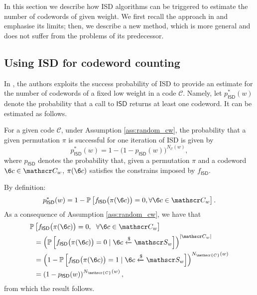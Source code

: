In this section we describe how ISD algorithms can be triggered to estimate the number of codewords of given weight. 
We first recall the approach in \cite{hirotomo} and emphasise its limits; then, we describe a new method, which is more general and does not suffer from the problems of its predecessor.

\subsection{Using ISD for codeword counting}

In \cite{hirotomo}, the authors exploits the success probability of ISD to provide an estimate for the number of codewords of a fixed low weight in a code $\mathscr{C}$.
Namely, let $p^*_{\mathsf{ISD}}(w)$ denote the probability that a call to $\mathsf{ISD}$ returns at least one codeword.
It can be estimated as follows.
\begin{proposition}
For a given code $\mathscr C$, under Assumption \ref{ass:random_cw}, the probability that a given permutation $\pi$ is successful for one iteration of ISD is given by
\begin{equation}
\label{eq:japan}
p^{*}_{\mathsf{ISD}}(w) = 1 - \big(1- p_{\mathsf{ISD}}(w)\big)^{N_{\mathscr{C}}(w)},
\end{equation}
where $p_{\mathsf{ISD}}$ denotes the probability that, given a permutation $\pi$ and a codeword $\6c\in\mathscr C_w$, $\pi(\6c)$ satisfies the constrains imposed by $f_{\mathsf{ISD}}$.
\end{proposition}
\begin{IEEEproof}
By definition:
\begin{equation*}
p^{*}_{\mathsf{ISD}}(w) = 1 - \mathbb{P}\left[f_{\mathsf{ISD}}\big(\pi(\6c)\big) = 0,\forall \6c\in \mathscr C_w \right].
\end{equation*}
As a consequence of Assumption \ref{ass:random_cw}, we have that 
\begin{align*}
\mathbb{P}&\nonumber \left[f_{\mathsf{ISD}}\big(\pi(\6c)\big) = 0,\hspace{2mm}\forall \6c\in \mathscr C_w \right] \\\nonumber
& = \left(\mathbb{P}\left[f_{\mathsf{ISD}}\big(\pi(\6c)\big) = 0\mid\6c\xleftarrow{\$}\mathscr S_w \right]\right)^{|\mathscr C_w|}\\\nonumber
& = \left(1-\mathbb{P}\left[f_{\mathsf{ISD}}\big(\pi(\6c)\big) = 1\mid\6c\xleftarrow{\$}\mathscr S_w \right]\right)^{N_{\mathscr{C}}(w)}\\\nonumber
& = \left(1-p_{\mathsf{ISD}}(w)\right)^{N_{\mathscr{C}}(w)},
\end{align*}
from which the result follows.
\end{IEEEproof}

